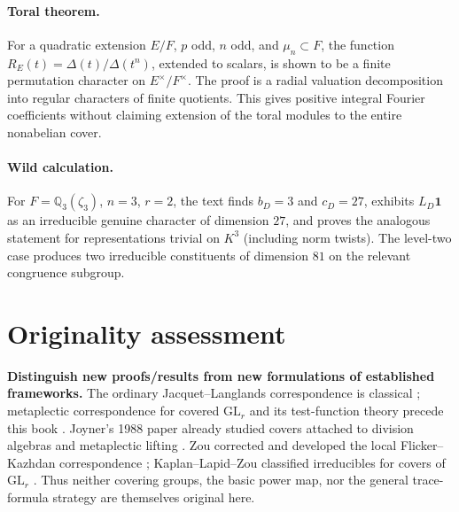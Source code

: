 \documentclass[12pt,letterpaper]{article}
\begin{document}
\paragraph{Toral theorem.}
For a quadratic extension $E/F$, $p$ odd, $n$ odd, and $\mu_n\subset F$,
the function $R_E(t)=\Delta(t)/\Delta(t^n)$, extended to scalars,
is shown to be a finite permutation character on $E^\times/F^\times$.
The proof is a radial valuation decomposition into regular characters of
finite quotients. This gives positive integral Fourier coefficients
without claiming extension of the toral modules to the entire
nonabelian cover.

\paragraph{Wild calculation.}
For $F=\mathbb Q_3(\zeta_3)$, $n=3$, $r=2$, the text finds
$b_D=3$ and $c_D=27$, exhibits $L_D\mathbf1$ as an irreducible
genuine character of dimension $27$, and proves the analogous
statement for representations trivial on $K^3$ (including norm twists).
The level-two case produces two irreducible constituents of dimension
$81$ on the relevant congruence subgroup.

\section{Originality assessment}
\textbf{Distinguish new proofs/results from new formulations of established
frameworks.} The ordinary Jacquet--Langlands correspondence is classical
\cite{JL70}; metaplectic correspondence for covered $\mathrm{GL}_r$ and
its test-function theory precede this book \cite{FK86}. Joyner's 1988
paper already studied covers attached to division algebras and metaplectic
lifting \cite{Jo88}. Zou corrected and developed the local
Flicker--Kazhdan correspondence \cite{Zo23}; Kaplan--Lapid--Zou
classified irreducibles for covers of $\mathrm{GL}_r$ \cite{KLZ23}.
Thus neither covering groups, the basic power map, nor the general
trace-formula strategy are themselves original here.
\end{document}
